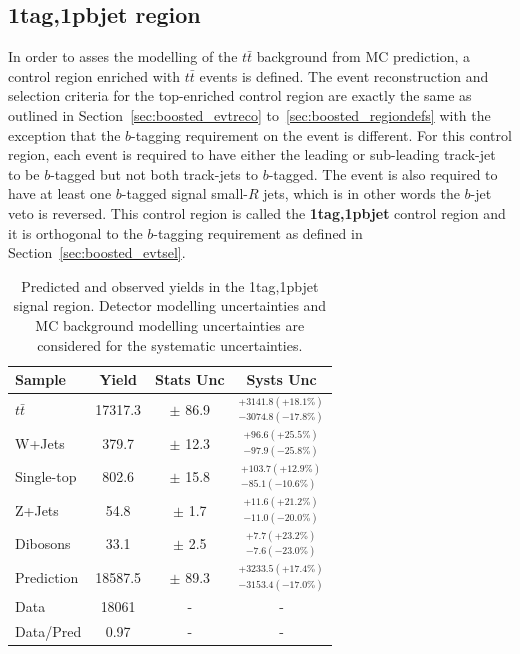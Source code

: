 \subsection{1tag,1pbjet region}
\label{app:boosted_ttbarmodel_topcr}

In order to asses the modelling of the $t\bar{t}$ background from MC prediction, a control region enriched with $t\bar{t}$ events is defined.
The event reconstruction and selection criteria for the top-enriched control region are exactly the same as outlined in 
Section~\ref{sec:boosted_evtreco} to~\ref{sec:boosted_regiondefs} with the exception that the $b$-tagging requirement on the event is different. 
For this control region, each event is required to have either the leading or sub-leading track-jet to be $b$-tagged but not both track-jets to $b$-tagged.
The event is also required to have at least one $b$-tagged signal small-$R$ jets, which is in other words the $b$-jet veto is reversed.
This control region is called the \textbf{1tag,1pbjet} control region and it is orthogonal to the $b$-tagging requirement as defined 
in Section~\ref{sec:boosted_evtsel}. 


\renewcommand{\arraystretch}{1.5}
\begin{table}[!htbp]
\begin{center}
\begin{tabular}{l|c|c|c} 
Sample        &    Yield &  Stats Unc &   Systs Unc \\ 
\hline 
$t\bar{t}$    &  17317.3 & $\pm$ 86.9    & $^{+3141.8(+18.1\%)}_{-3074.8(-17.8\%)}$ \\ 
W+Jets        &  379.7   & $\pm$ 12.3    & $^{+96.6(+25.5\%)}_{-97.9(-25.8\%)}$ \\ 
Single-top    &  802.6   & $\pm$ 15.8    & $^{+103.7(+12.9\%)}_{-85.1(-10.6\%)}$ \\ 
Z+Jets        &  54.8    & $\pm$ 1.7     & $^{+11.6(+21.2\%)}_{-11.0(-20.0\%)}$ \\ 
Dibosons      &  33.1    & $\pm$ 2.5     & $^{+7.7(+23.2\%)}_{-7.6(-23.0\%)}$ \\ 
\hline 
Prediction    &  18587.5 & $\pm$ 89.3    & $^{+3233.5(+17.4\%)}_{-3153.4(-17.0\%)}$ \\ 
Data          &  18061   & -  & - \\ 
\hline 
Data/Pred     &  0.97    & -  & - \\ 
\hline 
\end{tabular}
\end{center}
\caption{Predicted and observed yields in the 1tag,1pbjet signal region. Detector modelling 
uncertainties and MC background modelling uncertainties are considered for the systematic uncertainties.}
\label{tab:boosted_topcr_yields}
\end{table}
\renewcommand{\arraystretch}{1.0}



